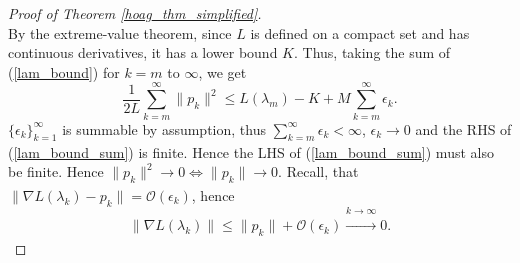 \documentclass[11pt, twoside]{report}
\begin{document}
\begin{proof}[Proof of Theorem \ref{hoag_thm_simplified}]
\begin{equation}
\end{equation}
By the extreme-value theorem, since $L$ is defined on a compact set and has continuous derivatives, it has a lower bound $K$. Thus, taking the sum of (\ref{lam_bound}) for $k = m$ to $\infty$, we get
\begin{equation} \label{lam_bound_sum}
   \frac{1}{2L}\sum_{k=m}^\infty \|p_k\|^2 \leq L(\lambda_m) - K + M\sum_{k=m}^\infty \epsilon_k.
\end{equation}
$\{\epsilon_k\}_{k=1}^\infty$ is summable by assumption, thus $\sum_{k=m}^\infty \epsilon_k < \infty$, $\epsilon_k \xrightarrow[]{} 0$ and the RHS of (\ref{lam_bound_sum}) is finite. Hence the LHS of (\ref{lam_bound_sum}) must also be finite. Hence $\|p_k\|^2 \xrightarrow[]{} 0 \iff \|p_k\| \xrightarrow[]{} 0.$ Recall, that $\|\nabla L(\lambda_k) - p_k\| = \mathcal{O}(\epsilon_k)$, hence 
\[\|\nabla L(\lambda_k)\| \leq \|p_k\| + \mathcal{O}(\epsilon_k) \xrightarrow[]{k \xrightarrow[]{} \infty} 0.\]

\end{proof}
\end{document}
